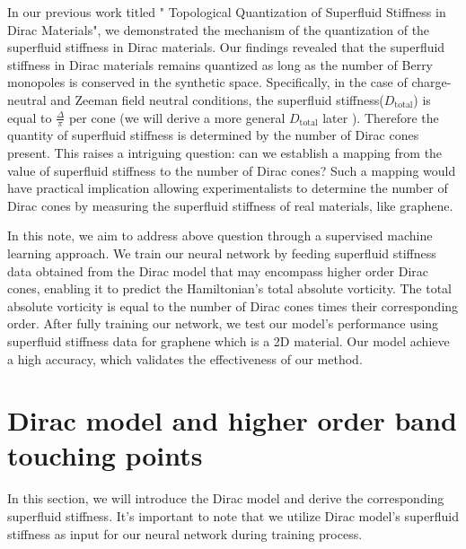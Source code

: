 \documentclass{article}
\begin{document}
In our previous work titled " Topological Quantization of Superfluid Stiffness in Dirac Materials", we demonstrated the mechanism of the quantization of the superfluid stiffness in Dirac materials. Our findings revealed that the superfluid stiffness in Dirac materials remains quantized as long as the number of Berry monopoles is conserved in the synthetic space. Specifically, in the case of charge-neutral and Zeeman field neutral conditions, the superfluid stiffness($ D_{\textrm{total}}  $) is equal to $  \frac{\Delta}{\pi}  $  per cone (we will derive a more general $ D_{\textrm{total}} $ later ). Therefore the quantity of superfluid stiffness is determined by the number of Dirac cones present. This raises a intriguing question: can we establish a mapping from the value of superfluid stiffness to the number of Dirac cones? Such a mapping would have practical implication allowing experimentalists to determine the number of Dirac cones by measuring the superfluid stiffness of real materials, like graphene.

In this note, we aim to address above question through a supervised machine learning approach. We train our neural network by feeding superfluid stiffness data obtained from the Dirac model that may encompass higher order Dirac cones, enabling it to predict the Hamiltonian's total absolute vorticity. The total absolute vorticity is equal to the number of Dirac cones times their corresponding order.  After fully training our network, we test our model's performance using superfluid stiffness data for graphene which is a 2D material. Our model achieve a high accuracy, which validates the effectiveness of our method.

\section{Dirac model and higher order band touching points}
In this section, we will introduce the Dirac model and derive the corresponding superfluid stiffness. It's important to note that we utilize Dirac model's superfluid stiffness as input for our neural network during training process.
\end{document}
